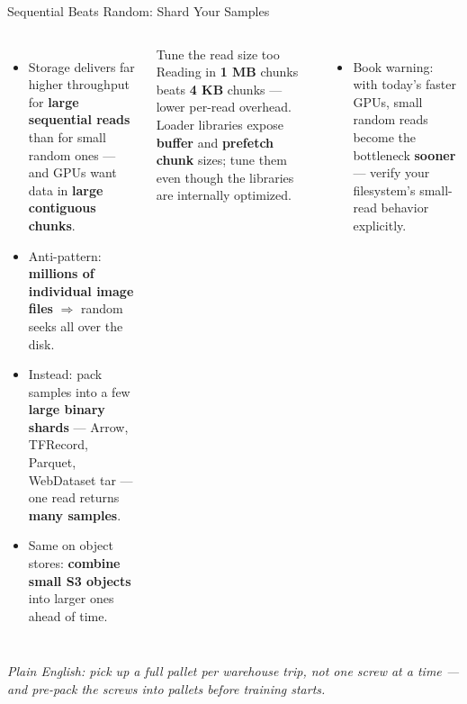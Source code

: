 \documentclass[aspectratio=169]{beamer}
\newcommand{\kw}[1]{\textbf{\textcolor{kwblue}{#1}}}
\newcommand{\pe}[1]{\par{\setlength{\fboxsep}{2.5pt}\noindent\colorbox{navy!9}{\parbox{\dimexpr\textwidth-5pt\relax}{\footnotesize\itshape Plain English: #1}}}}
\begin{document}
\begin{frame}{Sequential Beats Random: Shard Your Samples}
  \begin{columns}[t]
    \begin{itemize}\small
      \item Storage delivers far higher throughput for \kw{large sequential reads} than for
            small random ones --- and GPUs want data in \kw{large contiguous chunks}.
      \item Anti-pattern: \kw{millions of individual image files} $\Rightarrow$ random seeks
            all over the disk.
      \item Instead: pack samples into a few \kw{large binary shards} --- Arrow, TFRecord,
            Parquet, WebDataset tar --- one read returns \kw{many samples}.
      \item Same on object stores: \kw{combine small S3 objects} into larger ones ahead of time.
    \end{itemize}
    \begin{block}{Tune the read size too}
      \small Reading in \kw{1 MB} chunks beats \kw{4 KB} chunks --- lower per-read overhead.
      Loader libraries expose \kw{buffer} and \kw{prefetch chunk} sizes; tune them even though
      the libraries are internally optimized.
    \end{block}
    \begin{itemize}\small
      \item Book warning: with today's faster GPUs, small random reads become the bottleneck
            \kw{sooner} --- verify your filesystem's small-read behavior explicitly.
    \end{itemize}
  \end{columns}
  \pe{pick up a full pallet per warehouse trip, not one screw at a time --- and pre-pack the screws into pallets before training starts.}
\end{frame}
\end{document}
